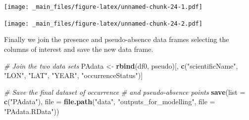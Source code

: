 \documentclass[
]{book}
\newenvironment{Shaded}{\begin{snugshade}}{\end{snugshade}}
\newcommand{\AttributeTok}[1]{\textcolor[rgb]{0.13,0.29,0.53}{#1}}
\newcommand{\CommentTok}[1]{\textcolor[rgb]{0.56,0.35,0.01}{\textit{#1}}}
\newcommand{\DecValTok}[1]{\textcolor[rgb]{0.00,0.00,0.81}{#1}}
\newcommand{\FloatTok}[1]{\textcolor[rgb]{0.00,0.00,0.81}{#1}}
\newcommand{\FunctionTok}[1]{\textcolor[rgb]{0.13,0.29,0.53}{\textbf{#1}}}
\newcommand{\NormalTok}[1]{#1}
\newcommand{\OtherTok}[1]{\textcolor[rgb]{0.56,0.35,0.01}{#1}}
\newcommand{\SpecialCharTok}[1]{\textcolor[rgb]{0.81,0.36,0.00}{\textbf{#1}}}
\newcommand{\StringTok}[1]{\textcolor[rgb]{0.31,0.60,0.02}{#1}}
\begin{document}
\texttt{[image: \_main\_files/figure-latex/unnamed-chunk-24-1.pdf]}

\begin{Shaded}
\end{Shaded}

\texttt{[image: \_main\_files/figure-latex/unnamed-chunk-24-2.pdf]}

Finally we join the presence and pseudo-absence data frames selecting the columns of interest and save the new data frame.

\begin{Shaded}
\begin{Highlighting}[]
\CommentTok{\# Join the two data sets}
\NormalTok{PAdata }\OtherTok{\textless{}{-}} \FunctionTok{rbind}\NormalTok{(df0, pseudo)[, }\FunctionTok{c}\NormalTok{(}\StringTok{"scientificName"}\NormalTok{,}
    \StringTok{"LON"}\NormalTok{, }\StringTok{"LAT"}\NormalTok{, }\StringTok{"YEAR"}\NormalTok{, }\StringTok{"occurrenceStatus"}\NormalTok{)]}

\CommentTok{\# Save the final dataset of occurrence}
\CommentTok{\# and pseudo{-}absence points}
\FunctionTok{save}\NormalTok{(}\AttributeTok{list =} \FunctionTok{c}\NormalTok{(}\StringTok{"PAdata"}\NormalTok{), }\AttributeTok{file =} \FunctionTok{file.path}\NormalTok{(}\StringTok{"data"}\NormalTok{,}
    \StringTok{"outputs\_for\_modelling"}\NormalTok{, }\AttributeTok{file =} \StringTok{"PAdata.RData"}\NormalTok{))}
\end{Highlighting}
\end{Shaded}
\end{document}
